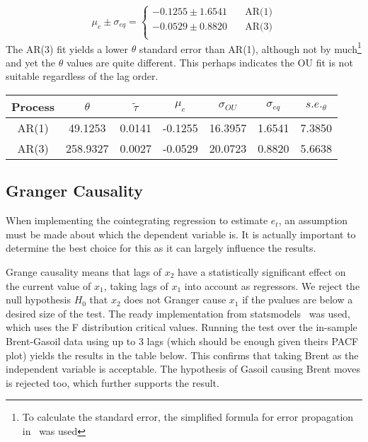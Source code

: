 \documentclass[11pt]{article}
\begin{document}
\begin{equation}
 \mu_e \pm \sigma_{eq} =
  \begin{cases}
    -0.1255 \pm  1.6541 & \quad \text{AR(1)} \\
    -0.0529 \pm  0.8820  & \quad \text{AR(3)}\\
  \end{cases}
\end{equation}
The AR(3) fit yields a lower  \(\theta\) standard error  than AR(1),
although not by much\footnote{To calculate the standard error, the simplified formula for error propagation in~\cite{error} was used } and yet the \(\theta\) values are quite different.
This perhaps indicates the OU fit is not suitable regardless of the lag
order.
    \begin{longtable}[]{@{}ccccccc@{}}
\toprule
Process & \(\theta\) & \(\tilde{\tau}\) & \(\mu_e\) & \(\sigma_{OU}\) &
\(\sigma_{eq}\) & \(s.e._\theta\)\tabularnewline
\midrule
\endhead
AR(1) & 49.1253 & 0.0141 & -0.1255 & 16.3957 & 1.6541 &
7.3850\tabularnewline
AR(3) & 258.9327 & 0.0027 & -0.0529 & 20.0723 & 0.8820 &
5.6638\tabularnewline
\bottomrule
\end{longtable}
    
    
    \subsection{Granger Causality}\label{granger-causality}


When implementing the cointegrating regression to estimate \(e_t\), an
assumption must be made about which the dependent variable is. It is
actually important to determine the best choice for this as it can largely influence the results.

 Grange causality means that lags of $x_2$ have a statistically significant effect on the current value of $x_1$, taking lags of $x_1$ into account as regressors. We reject the null hypothesis $H_0$ that $x_2$ does not Granger cause $x_1$ if the pvalues are below a desired size of the test. The ready implementation from statsmodels~\cite{causality} was used, which uses the F distribution critical values. Running the test over the in-sample Brent-Gasoil data using up to 3 lags (which should be enough given theirs PACF plot) yields the results in the table below. This confirms that taking Brent as the independent variable is acceptable. The hypothesis of Gasoil causing Brent moves is rejected too, which further supports the result.    
    
\end{document}
